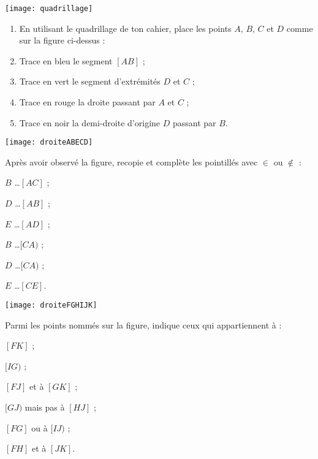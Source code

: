 

\begin{exercice}
 \begin{center} \texttt{[image: quadrillage]} \end{center}
 \begin{enumerate}
  \item En utilisant le quadrillage de ton cahier, place les points $A$, $B$, $C$ et $D$ comme sur la figure ci-dessus :
  \item Trace en bleu le segment $[AB]$ ;
  \item Trace en vert le segment d'extrémités $D$ et $C$ ;
  \item Trace en rouge la droite passant par $A$ et $C$ ;
  \item Trace en noir la demi-droite d'origine $D$ passant par $B$.
  \end{enumerate}
 \end{exercice}


\begin{exercice}
 \begin{center} \texttt{[image: droiteABECD]} \end{center}
 Après avoir observé la figure, recopie et complète les pointillés avec $\in$ ou $\notin$ :
    \begin{colenumerate}{3}
     \item $B$ \ldots $[AC]$ ;
     \item $D$ \ldots $[AB]$ ;
     \item $E$ \ldots $[AD]$ ;
     \item $B$ \ldots $[CA)$ ;
     \item $D$ \ldots $[CA)$ ;
     \item $E$ \ldots $[CE]$.
     \end{colenumerate}
\end{exercice}


\begin{exercice}[À trouver]
 \begin{center} \texttt{[image: droiteFGHIJK]}  \end{center}
 Parmi les points nommés sur la figure, indique ceux qui appartiennent à :
    \begin{colenumerate}{2}
     \item $[FK]$ ;
     \item $[IG)$ ;
     \item $[FJ]$ et à $[GK]$ ;
     \item $[GJ)$ mais pas à $[HJ]$ ;
     \item $[FG]$ ou à $[IJ)$ ;
     \item $[FH]$ et à $[JK]$.
     \end{colenumerate}
\end{exercice}


